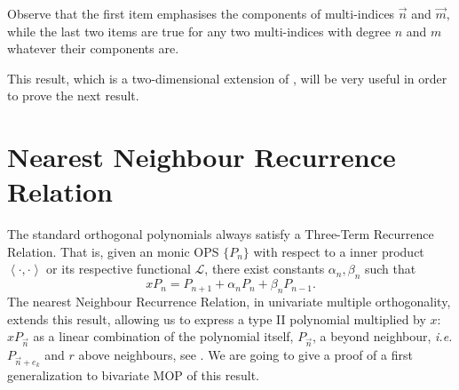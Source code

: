 \documentclass[12pt,a4]{report}
\theoremstyle{plain}
\newcommand{\prodesc}[2]{\left\langle #1 , #2 \right\rangle}
\begin{document}
Observe that the first item emphasises the components of multi-indices $\vec n$ and $\vec m$, while the last two items are true for any two multi-indices with degree $n$ and $m$ whatever their components are.

This result, which is a two-dimensional extension of \cite[Theorem 23.1.6]{Ismail}, will be very useful in order to prove the next result.


\section{Nearest Neighbour Recurrence Relation}
\label{sec:NNRR}

The standard orthogonal polynomials always satisfy a Three-Term Recurrence Relation. That is, given an monic OPS $\{P_n\}$ with respect to a inner product $\prodesc{\cdot}{\cdot}$ or its respective functional $\mathcal L$, there exist constants $\alpha_n,\beta_n$ such that
$$
xP_n = P_{n+1}+ \alpha_n P_n + \beta_n P_{n-1}.
$$
The nearest Neighbour Recurrence Relation, in univariate multiple orthogonality, extends this result, allowing us to express a type II polynomial multiplied by $x$: $xP_{\vec n}$ as a linear combination of the polynomial itself, $P_{\vec n}$, a beyond neighbour, \textit{i.e.} $P_{\vec n + e_k}$ and $r$ above neighbours, see \cite[Theorem 23.1.7]{Ismail}. We are going to give a proof of a first generalization to bivariate MOP of this result. 
\end{document}
